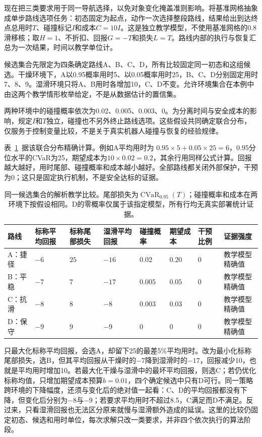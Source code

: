 现在把三类要求用于同一导航选择，以免对象变化掩盖准则影响。将基准网格抽象成单步路线选项任务：初态固定为起点，动作一次选择整段路线，结果给出到达终点总用时$T$、碰撞标记$I$和成本$C=10I$。这是独立教学模型，不使用基准网格的0.8滑移核；取$H=1$、不折扣、回报$G=-T$和损失$L=T$。路线内部的执行与恢复汇总为一次结果，时间以教学单位计。

候选集合先限定为四条确定路线A、B、C、D，所有比较固定同一初态和这组候选。干燥环境下，A以0.95概率用时5、以0.05概率用时25，B、C、D分别固定用时7、8、9。湿滑环境只将A、B用时各增加10，C、D不变。允许环境集合在本例中由这两个教学情形枚举给定，不是从数据估计的置信集。

两种环境中的碰撞概率依次为0.02、0.005、0.003、0。为分离时间与安全成本的影响，规定$I$和$T$独立，碰撞也不另外终止路线选项。这些假设共同确定联合分布，仅服务于控制变量比较，不是关于真实机器人碰撞与恢复的经验规律。

表~\ref{tab:rl-trustworthy-comparison}~据该联合分布精确计算。例如A平均用时为
$0.95\times5+0.05\times25=6$，0.95分位水平的CVaR为25，期望成本为$10\times0.02=0.2$，其余行用同样公式计算。回报越大越好，用时尾部、碰撞概率和成本越小越好。全部路线都关闭外部保护，干预为0；这只是固定执行机制，不是安全达标的证据。

\begin{table}[t]
  \centering
  \begin{tabularx}{\linewidth}{@{}>{\raggedright\arraybackslash}p{14mm}XXXXXXX@{}}
    \toprule
    路线 & 标称平均回报 & 标称尾部损失 & 湿滑平均回报 & 碰撞概率 & 期望成本 & 干预比例 & 证据强度 \\
    \midrule
    A：捷径 & $-6$ & $25$ & $-16$ & $0.02$ & $0.20$ & $0$ & 教学模型精确值 \\
    B：平稳 & $-7$ & $7$ & $-17$ & $0.005$ & $0.05$ & $0$ & 教学模型精确值 \\
    C：抗滑 & $-8$ & $8$ & $-8$ & $0.003$ & $0.03$ & $0$ & 教学模型精确值 \\
    D：保守 & $-9$ & $9$ & $-9$ & $0$ & $0$ & $0$ & 教学模型精确值 \\
    \bottomrule
  \end{tabularx}
  \caption{同一候选集合的解析教学比较。尾部损失为$\operatorname{CVaR}_{0.95}(T)$；碰撞概率和成本在两环境下按假设相同。D的零概率仅属于该指定模型，所有行均无真实部署统计证据。}
  \label{tab:rl-trustworthy-comparison}
\end{table}

只最大化标称平均回报，会选A，却留下25的最差5\%平均用时。改为最小化标称尾部损失，选B，但其平均回报从干燥时的$-7$降到湿滑时的$-17$，回报减少10，也就是平均用时增加10。若最大化干燥与湿滑中的最坏平均回报，则选C；若仍优化标称均值，只增加期望成本预算$b=0.01$，四个确定候选中只有D可行。同一策略跨环境的下降幅度，还须与变化后的绝对值一起看：C、D的平均回报都没有下降，但变化后分别为$-8$与$-9$；若要求平均用时不超过8.5，C满足而D不满足。反过来，只看湿滑回报也无法区分原来就慢与湿滑额外造成的延误。这里的比较仍固定初态、候选和用时单位，每次求解只改一类要求，并非四个依次执行的算法阶段。

